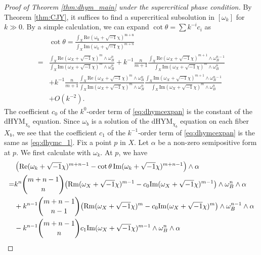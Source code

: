 \documentclass{amsart}
\numberwithin{equation}{section}
\theoremstyle{plain}
\theoremstyle{definition}
\theoremstyle{remark}
\begin{document}
\begin{proof}[Proof of Theorem \ref{thm:dhym_main} under the supercritical phase condition]
    By Theorem \ref{thm:CJY}, it suffices to find a supercritical subsolution in $[\omega_k]$ for $k\gg0$.
    By a simple calculation, we can expand $\cot\theta=\sum k^{-i}c_i$ as 
    \begin{equation}\label{eq:dhymcexpan}
        \begin{split}
        &\cot\theta=\frac{\int_X\mathrm{Re(\omega_k+\sqrt{-1}\chi)^{m+n}}}{\int_X\mathrm{Im}(\omega_k+\sqrt{-1}\chi)^{m+n}}\\
        =&\frac{\int_X\mathrm{Re}(\omega_X+\sqrt{-1}\chi)^m\wedge\omega_B^n}{\int_X\mathrm{Im}(\omega_X+\sqrt{-1}\chi)^m\wedge\omega_B^n}+k^{-1}\frac{n}{m+1}\frac{\int_X\mathrm{Re}(\omega_X+\sqrt{-1}\chi)^{m+1}\wedge\omega_B^{n-1}}{\int_X\mathrm{Im}(\omega_X+\sqrt{-1}\chi)^m\wedge\omega_B^n}\\
        &+k^{-1}\frac{n}{m+1}\frac{\int_X\mathrm{Re}(\omega_X+\sqrt{-1}\chi)^m\wedge\omega_B^n}{\int_X\mathrm{Im}(\omega_X+\sqrt{-1}\chi)^m\wedge\omega_B^n}\frac{\int_X\mathrm{Im}(\omega_X+\sqrt{-1}\chi)^{m+1}\wedge\omega_B^{n-1}}{\int_X\mathrm{Im}(\omega_X+\sqrt{-1}\chi)^m\wedge\omega_B^n}\\
        &+O(k^{-2}).
        \end{split}
    \end{equation}
    The coefficient $c_0$ of the $k^{0}$-order term of \eqref{eq:dhymcexpan} is the constant of the dHYM$_{\chi_b}$ equation. Since $\omega_b$ is a solution of the dHYM$_{\chi_b}$ equation on each fiber $X_b$, we see that the coefficient $c_1$ of the $k^{-1}$-order term of \eqref{eq:dhymcexpan} is the same as \eqref{eq:dhymc_1}.
    Fix a point $p$ in $X$. Let $\alpha$ be a non-zero semipositive form at $p$. We first calculate with $\omega_k$. At $p$, we have
    \begin{align*}%
        &\left(\mathrm{Re}(\omega_k+\sqrt{-1}\chi)^{m+n-1}-\cot\theta\, \mathrm{Im}(\omega_k+\sqrt{-1}\chi)^{m+n-1}\right)\wedge\alpha\\
        =&k^n {{m+n-1}\choose n} \big(\mathrm{Rm}(\omega_X+\sqrt{-1}\chi)^{m-1}-c_0\mathrm{Im}(\omega_X+\sqrt{-1}\chi)^{m-1}\big)\wedge\omega_B^n\wedge\alpha\notag\\
        &+k^{n-1}{m+n-1\choose n-1} \big(\mathrm{Rm}(\omega_X+\sqrt{-1}\chi)^m -c_0\mathrm{Im}(\omega_X+\sqrt{-1}\chi)^m\big)\wedge\omega_B^{n-1}\wedge\alpha\notag\\
        &-k^{n-1}{m+n-1\choose n}c_1\mathrm{Im}(\omega_X+\sqrt{-1}\chi)^{m-1}\wedge\omega_B^n\wedge\alpha\notag\\

\end{align*}
\end{proof}
\end{document}
